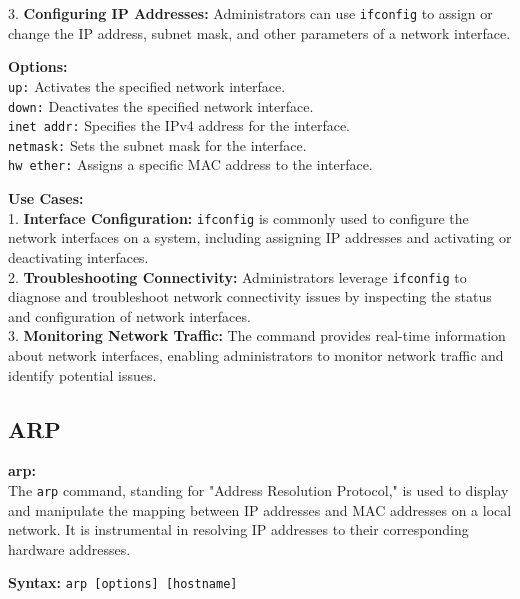 \documentclass[11pt]{report}
\begin{document}
3. \textbf{Configuring IP Addresses:} Administrators can use \texttt{ifconfig} to assign or change the IP address, subnet mask, and other parameters of a network interface.

\vspace{\baselineskip}

\textbf{Options:} \\
\texttt{up:} Activates the specified network interface.\\
\texttt{down:} Deactivates the specified network interface.\\
\texttt{inet addr:} Specifies the IPv4 address for the interface.\\
\texttt{netmask:} Sets the subnet mask for the interface.\\
\texttt{hw ether:} Assigns a specific MAC address to the interface.

\vspace{\baselineskip}
\vspace{\baselineskip}
\vspace{\baselineskip}

\textbf{Use Cases:} \\
1. \textbf{Interface Configuration:} \texttt{ifconfig} is commonly used to configure the network interfaces on a system, including assigning IP addresses and activating or deactivating interfaces.\\
2. \textbf{Troubleshooting Connectivity:} Administrators leverage \texttt{ifconfig} to diagnose and troubleshoot network connectivity issues by inspecting the status and configuration of network interfaces.\\
3. \textbf{Monitoring Network Traffic:} The command provides real-time information about network interfaces, enabling administrators to monitor network traffic and identify potential issues.

\subsection{ARP}
\textbf{arp:} \\
The \texttt{arp} command, standing for "Address Resolution Protocol," is used to display and manipulate the mapping between IP addresses and MAC addresses on a local network. It is instrumental in resolving IP addresses to their corresponding hardware addresses.

\vspace{\baselineskip}

\textbf{Syntax:}
\texttt{arp [options] [hostname]}
\end{document}
